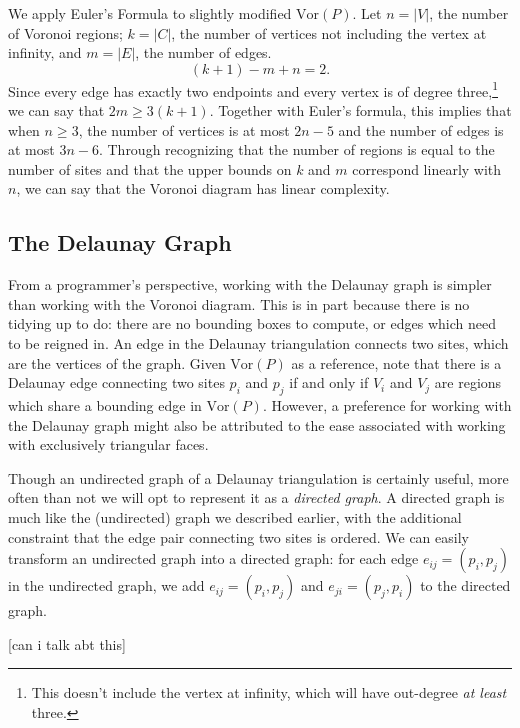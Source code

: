 \documentclass[12pt,twoside]{reedthesis}
\begin{document}
      We apply Euler's Formula to slightly modified $\mbox{Vor}(P)$. Let $n = |V|$, the number of Voronoi regions; $k = |C|$, the number of vertices not including the vertex at infinity, and $m = |E|$, the number of edges.
      $$(k + 1) - m + n = 2.$$ 
      Since every edge has exactly two endpoints and every vertex is of degree three,\footnote{This doesn't include the vertex at infinity, which will have out-degree \emph{at least} three.} we can say that $2m \geq 3(k + 1)$. Together with Euler's formula, this implies that when $n\geq 3$, the number of vertices is at most $2n-5$ and the number of edges is at most $3n-6$. Through recognizing that the number of regions is equal to the number of sites and that the upper bounds on $k$ and $m$ correspond linearly with $n$, we can say that the Voronoi diagram has linear complexity. 

    \subsection{The Delaunay Graph} %
    \label{sub:delaunay_graph}
      From a programmer's perspective, working with the Delaunay graph is simpler than working with the Voronoi diagram. This is in part because there is no tidying up to do: there are no bounding boxes to compute, or edges which need to be reigned in. An edge in the Delaunay triangulation connects two sites, which are the vertices of the graph. Given $\mbox{Vor}(P)$ as a reference, note that there is a Delaunay edge connecting two sites $p_{i}$ and $p_{j}$ if and only if $V_{i}$ and $V_{j}$ are regions which share a bounding edge in $\mbox{Vor}(P)$. However, a preference for working with the Delaunay graph might also be attributed to the ease associated with working with exclusively triangular faces. \par

      Though an undirected graph of a Delaunay triangulation is certainly useful, more often than not we will opt to represent it as a \emph{directed graph}. A directed graph is much like the (undirected) graph we described earlier, with the additional constraint that the edge pair connecting two sites is ordered. We can easily transform an undirected graph into a directed graph: for each edge $e_{ij} = (p_{i}, p_{j})$ in the undirected graph, we add $e_{ij} = (p_{i}, p_{j})$ and $e_{ji} = (p_{j}, p_{i})$ to the directed graph. 

      [can i talk abt this]


\end{document}
